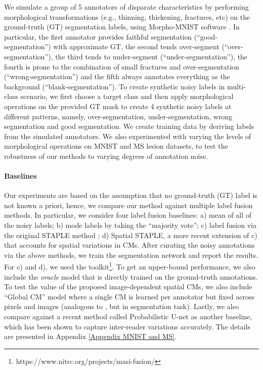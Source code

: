 We simulate a group of 5 annotators of disparate characteristics by performing morphological transformations (e.g., thinning, thickening, fractures, etc) on the ground-truth (GT) segmentation labels, using Morpho-MNIST software \cite{castro2019morphomnist}. In particular, the first annotator provides faithful segmentation (``good-segmentation'') with approximate GT, the second tends over-segment (``over-segmentation''), the third tends to under-segment (``under-segmentation''), the fourth is prone to the combination of small fractures and over-segmentation (``wrong-segmentation'') and the fifth always annotates everything as the background (``blank-segmentation''). To create synthetic noisy labels in multi-class scenario, we first choose a target class and then apply morphological operations on the provided GT mask to create 4 synthetic noisy labels at different patterns, namely, over-segmentation, under-segmentation, wrong segmentation and good segmentation. We create training data by deriving labels from the simulated annotators. We also experimented with varying the levels of morphological operations on MNIST and MS lesion datasets, to test the robustness of our methods to varying degrees of annotation noise.


\paragraph{Baselines}
Our experiments are based on the assumption that no ground-truth (GT) label is not known a priori, hence, we compare our method against multiple label fusion methods. In particular, we consider four label fusion baselines: a) mean of all of the noisy labels; b) mode labels by taking the ``majority vote''; c) label fusion via the original STAPLE method \cite{warfield2004simultaneous}; d) Spatial STAPLE, a more recent extension of c) that accounts for spatial variations in CMs. After curating the noisy annotations via the above methods, we train the segmentation network and report the results. For c) and d), we used the toolkit\footnote{https://www.nitrc.org/projects/masi-fusion/}. To get an upper-bound performance, we also include the \textit{oracle} model that is directly trained on the ground-truth annotations. To test the value of the proposed image-dependent spatial CMs, we also include ``Global CM'' model where a single CM is learned per annotator but fixed across pixels and images (analogous to \etal \cite{raykar2009supervised,khetan2017learning,tanno2019learning}, but in segmentation task). Lastly, we also compare against a recent method called Probabilistic U-net as another baseline, which has been shown to capture inter-reader variations accurately. The details are presented in Appendix \ref{Appendix MNIST and MS}. 

